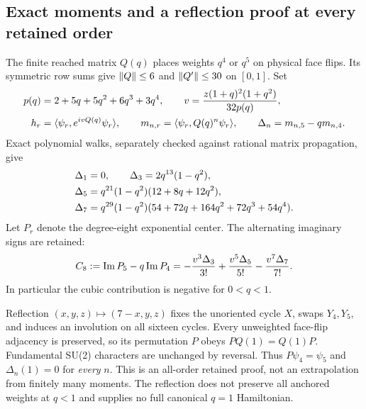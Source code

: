 \subsection{Exact moments and a reflection proof at every retained order}
The finite reached matrix $Q(q)$ places weights $q^4$ or $q^5$ on physical face flips. Its symmetric row sums give $\left\lVert Q\right\rVert\le6$ and $\left\lVert Q'\right\rVert\le30$ on $[0,1]$. Set
\begin{align}
 p(q)&=2+5q+5q^2+6q^3+3q^4,\qquad
 v=\frac{z(1+q)^2(1+q^2)}{32p(q)},\notag\\
 h_r&=\langle\psi_r,e^{ivQ(q)}\psi_r\rangle,\qquad
 m_{n,r}=\langle\psi_r,Q(q)^n\psi_r\rangle,\qquad
 \Delta_n=m_{n,5}-q m_{n,4}.
 \label{eq:ai3-moments}
\end{align}
Exact polynomial walks, separately checked against rational matrix propagation, give
\begin{align}
 \Delta_1&=0,\qquad \Delta_3=2q^{13}(1-q^2),\notag\\
 \Delta_5&=q^{21}(1-q^2)(12+8q+12q^2),\notag\\
 \Delta_7&=q^{29}(1-q^2)(54+72q+164q^2+72q^3+54q^4).
 \label{eq:ai3-exact-deltas}
\end{align}
Let $P_r$ denote the degree-eight exponential center. The alternating imaginary signs are retained:
\begin{equation}
 C_8:=\operatorname{Im} P_5-q\operatorname{Im} P_4
 =-\frac{v^3\Delta_3}{3!}+\frac{v^5\Delta_5}{5!}
 -\frac{v^7\Delta_7}{7!}.
 \label{eq:ai3-combination}
\end{equation}
In particular the cubic contribution is negative for $0<q<1$.

Reflection $(x,y,z)\mapsto(7-x,y,z)$ fixes the unoriented cycle $X$, swaps $Y_4,Y_5$, and induces an involution on all sixteen cycles. Every unweighted face-flip adjacency is preserved, so its permutation $P$ obeys $PQ(1)=Q(1)P$. Fundamental SU(2) characters are unchanged by reversal. Thus $P\psi_4=\psi_5$ and $\Delta_n(1)=0$ for \emph{every} $n$. This is an all-order retained proof, not an extrapolation from finitely many moments. The reflection does not preserve all anchored weights at $q<1$ and supplies no full canonical $q=1$ Hamiltonian.

